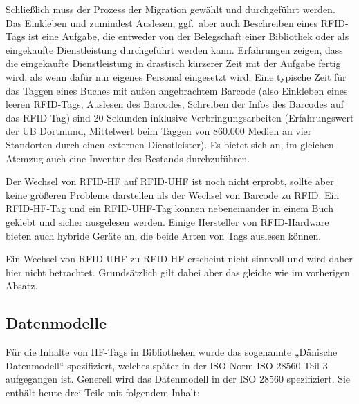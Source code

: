 \documentclass[
  11pt,
  letterpaper,
  DIV=11,
  twoside]{scrreprt}
\begin{document}
Schließlich muss der Prozess der Migration gewählt und durchgeführt
werden. Das Einkleben und zumindest Auslesen, ggf.~aber auch Beschreiben
eines RFID-Tags ist eine Aufgabe, die entweder von der Belegschaft einer
Bibliothek oder als eingekaufte Dienstleistung durchgeführt werden kann.
Erfahrungen zeigen, dass die eingekaufte Dienstleistung in drastisch
kürzerer Zeit mit der Aufgabe fertig wird, als wenn dafür nur eigenes
Personal eingesetzt wird. Eine typische Zeit für das Taggen eines Buches
mit außen angebrachtem Barcode (also Einkleben eines leeren RFID-Tags,
Auslesen des Barcodes, Schreiben der Infos des Barcodes auf das
RFID-Tag) sind 20 Sekunden inklusive Verbringungsarbeiten
(Erfahrungswert der UB Dortmund, Mittelwert beim Taggen von 860.000
Medien an vier Standorten durch einen externen Dienstleister). Es bietet
sich an, im gleichen Atemzug auch eine Inventur des Bestands
durchzuführen.

Der Wechsel von RFID-HF auf RFID-UHF ist noch nicht erprobt, sollte aber
keine größeren Probleme darstellen als der Wechsel von Barcode zu RFID.
Ein RFID-HF-Tag und ein RFID-UHF-Tag können nebeneinander in einem Buch
geklebt und sicher ausgelesen werden. Einige Hersteller von
RFID-Hardware bieten auch hybride Geräte an, die beide Arten von Tags
auslesen können.

Ein Wechsel von RFID-UHF zu RFID-HF erscheint nicht sinnvoll und wird
daher hier nicht betrachtet. Grundsätzlich gilt dabei aber das gleiche
wie im vorherigen Absatz.

\subsection{Datenmodelle}\label{datenmodelle}

Für die Inhalte von HF-Tags in Bibliotheken wurde das sogenannte
„Dänische Datenmodell`` spezifiziert, welches später in der ISO-Norm ISO
28560 Teil 3 aufgegangen ist. Generell wird das Datenmodell in der ISO
28560 spezifiziert. Sie enthält heute drei Teile mit folgendem Inhalt:
\end{document}

